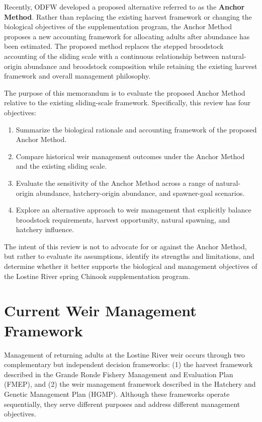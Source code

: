 \documentclass[12pt,letterpaper]{article}
\providecommand{\tightlist}{%
  \setlength{\itemsep}{0pt}\setlength{\parskip}{0pt}}
\begin{document}
Recently, ODFW developed a proposed alternative referred to as the \textbf{Anchor Method}. Rather than replacing the existing harvest framework or changing the biological objectives of the supplementation program, the Anchor Method proposes a new accounting framework for allocating adults after abundance has been estimated. The proposed method replaces the stepped broodstock accounting of the sliding scale with a continuous relationship between natural-origin abundance and broodstock composition while retaining the existing harvest framework and overall management philosophy.

The purpose of this memorandum is to evaluate the proposed Anchor Method relative to the existing sliding-scale framework. Specifically, this review has four objectives:

\begin{enumerate}
\def\labelenumi{\arabic{enumi}.}
\tightlist
\item
  Summarize the biological rationale and accounting framework of the proposed Anchor Method.
\item
  Compare historical weir management outcomes under the Anchor Method and the existing sliding scale.
\item
  Evaluate the sensitivity of the Anchor Method across a range of natural-origin abundance, hatchery-origin abundance, and spawner-goal scenarios.
\item
  Explore an alternative approach to weir management that explicitly balance broodstock requirements, harvest opportunity, natural spawning, and hatchery influence.
\end{enumerate}

The intent of this review is not to advocate for or against the Anchor Method, but rather to evaluate its assumptions, identify its strengths and limitations, and determine whether it better supports the biological and management objectives of the Lostine River spring Chinook supplementation program.

\section{Current Weir Management Framework}\label{current-weir-management-framework}

Management of returning adults at the Lostine River weir occurs through two complementary but independent decision frameworks: (1) the harvest framework described in the Grande Ronde Fishery Management and Evaluation Plan (FMEP), and (2) the weir management framework described in the Hatchery and Genetic Management Plan (HGMP). Although these frameworks operate sequentially, they serve different purposes and address different management objectives.
\end{document}
